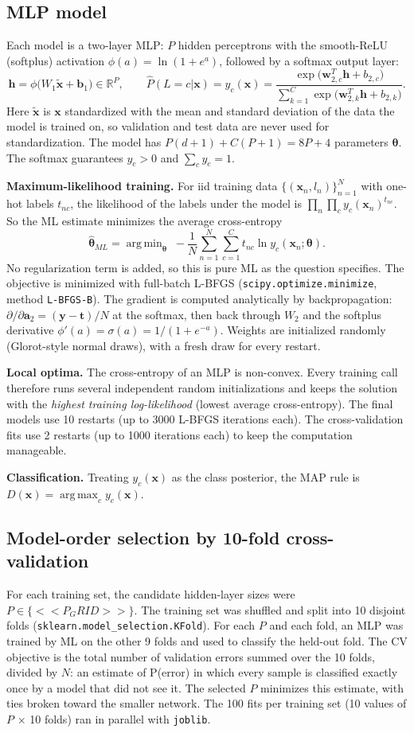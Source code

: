 \documentclass[11pt]{article}
\newcommand{\x}{{\mathbf{x}}}
\DeclareMathOperator*{\argmin}{arg\,min}\DeclareMathOperator*{\argmax}{arg\,max}
\begin{document}
\subsection*{MLP model}
Each model is a two-layer MLP: $P$ hidden perceptrons with the smooth-ReLU (softplus) activation $\phi(a)=\ln(1+e^{a})$, followed by a softmax output layer:
\[
\mathbf h=\phi\big(W_1\tilde\x+\mathbf b_1\big)\in\mathbb R^P,\qquad
\hat P(L=c|\x)=y_c(\x)=\frac{\exp\big(\mathbf w_{2,c}^T\mathbf h+b_{2,c}\big)}{\sum_{k=1}^C\exp\big(\mathbf w_{2,k}^T\mathbf h+b_{2,k}\big)} .
\]
Here $\tilde\x$ is $\x$ standardized with the mean and standard deviation of the data the model is trained on, so validation and test data are never used for standardization. The model has $P(d+1)+C(P+1)=8P+4$ parameters $\bm\theta$. The softmax guarantees $y_c>0$ and $\sum_cy_c=1$.

\textbf{Maximum-likelihood training.} For iid training data $\{(\x_n,l_n)\}_{n=1}^N$ with one-hot labels $t_{nc}$, the likelihood of the labels under the model is $\prod_n\prod_c y_c(\x_n)^{t_{nc}}$. So the ML estimate minimizes the average cross-entropy
\[
\hat{\bm\theta}_{ML}=\argmin_{\bm\theta}\;-\frac1N\sum_{n=1}^N\sum_{c=1}^C t_{nc}\ln y_c(\x_n;\bm\theta).
\]
No regularization term is added, so this is pure ML as the question specifies. The objective is minimized with full-batch L-BFGS (\texttt{scipy.optimize.minimize}, method \texttt{L-BFGS-B}). The gradient is computed analytically by backpropagation: $\partial/\partial\mathbf a_2=(\mathbf y-\mathbf t)/N$ at the softmax, then back through $W_2$ and the softplus derivative $\phi'(a)=\sigma(a)=1/(1+e^{-a})$. Weights are initialized randomly (Glorot-style normal draws), with a fresh draw for every restart.

\textbf{Local optima.} The cross-entropy of an MLP is non-convex. Every training call therefore runs several independent random initializations and keeps the solution with the \emph{highest training log-likelihood} (lowest average cross-entropy). The final models use 10 restarts (up to 3000 L-BFGS iterations each). The cross-validation fits use 2 restarts (up to 1000 iterations each) to keep the computation manageable.

\textbf{Classification.} Treating $y_c(\x)$ as the class posterior, the MAP rule is $D(\x)=\argmax_c y_c(\x)$.

\subsection*{Model-order selection by 10-fold cross-validation}
For each training set, the candidate hidden-layer sizes were $P\in\{<<P_GRID>>\}$. The training set was shuffled and split into 10 disjoint folds (\texttt{sklearn.model\_selection.KFold}). For each $P$ and each fold, an MLP was trained by ML on the other 9 folds and used to classify the held-out fold. The CV objective is the total number of validation errors summed over the 10 folds, divided by $N$: an estimate of P(error) in which every sample is classified exactly once by a model that did not see it. The selected $P$ minimizes this estimate, with ties broken toward the smaller network. The 100 fits per training set (10 values of $P$ $\times$ 10 folds) ran in parallel with \texttt{joblib}.
\end{document}

